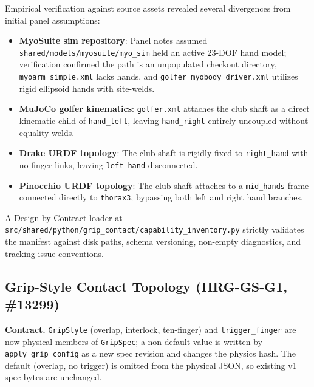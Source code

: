 \documentclass[11pt,a4paper]{article}
\begin{document}
Empirical verification against source assets revealed several divergences from
initial panel assumptions:
\begin{itemize}
\item \textbf{MyoSuite sim repository}: Panel notes assumed \texttt{shared/models/myosuite/myo\_sim}
held an active 23-DOF hand model; verification confirmed the path is an unpopulated checkout directory,
\texttt{myoarm\_simple.xml} lacks hands, and \texttt{golfer\_myobody\_driver.xml} utilizes rigid
ellipsoid hands with site-welds.
\item \textbf{MuJoCo golfer kinematics}: \texttt{golfer.xml} attaches the club shaft as a direct
kinematic child of \texttt{hand\_left}, leaving \texttt{hand\_right} entirely uncoupled without equality welds.
\item \textbf{Drake URDF topology}: The club shaft is rigidly fixed to \texttt{right\_hand} with no finger
links, leaving \texttt{left\_hand} disconnected.
\item \textbf{Pinocchio URDF topology}: The club shaft attaches to a \texttt{mid\_hands} frame connected
directly to \texttt{thorax3}, bypassing both left and right hand branches.
\end{itemize}

A Design-by-Contract loader at
\texttt{src/shared/python/grip\_contact/capability\_inventory.py}
strictly validates the manifest against disk paths, schema versioning, non-empty diagnostics,
and tracking issue conventions.

\subsection{Grip-Style Contact Topology (HRG-GS-G1, \#13299)}
\textbf{Contract.} \texttt{GripStyle} (overlap, interlock, ten-finger) and
\texttt{trigger\_finger} are now physical members of \texttt{GripSpec}; a
non-default value is written by \texttt{apply\_grip\_config} as a new spec
revision and changes the physics hash.  The default (overlap, no trigger) is
omitted from the physical JSON, so existing v1 spec bytes are unchanged.
\end{document}
